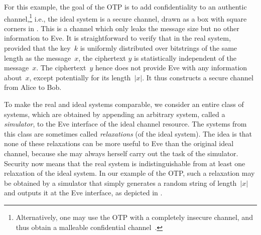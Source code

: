 For this example, the goal of the OTP is to add confidentiality to an
authentic channel,\footnote{Alternatively, one may use the OTP with a
  completely insecure channel, and thus obtain a malleable
  confidential channel~\cite{MRT12}.} i.e., the ideal system is a secure
channel, drawn as a box with square corners in
. This is a channel which only leaks the message size
but no other information to Eve. It is straightforward to verify that
in the real system, provided that the key~$k$ is uniformly distributed
over bitstrings of the same length as the message~$x$, the ciphertext
$y$ is statistically independent of the message~$x$. The
ciphertext~$y$ hence does not provide Eve with any information
about~$x$, except potentially for its length~$|x|$.  It thus
constructs a secure channel from Alice to Bob. 










To make the real and ideal systems comparable, we consider an entire class of
systems, which are obtained by appending an arbitrary system, called a
\emph{simulator}, to the Eve interface of the ideal channel
resource. The systems from this class are sometimes called
\emph{relaxations} (of the ideal system). The idea is that none of
these relaxations can be more useful to Eve than the original ideal
channel, because she may always herself carry out the task of the
simulator. Security now means that the real system is
indistinguishable from at least one relaxation of the ideal system. In
our example of the OTP, such a relaxation may be obtained by a
simulator that simply generates a random string of length~$|x|$ and
outputs it at the Eve interface, as depicted in
.

